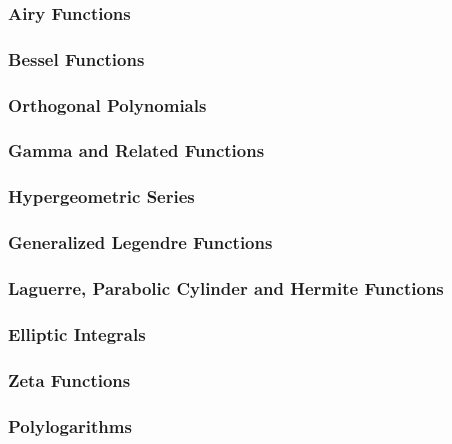 \subsubsection{Airy Functions}                 
\subsubsection{Bessel Functions}               
\subsubsection{Orthogonal Polynomials}         
\subsubsection{Gamma and Related Functions}    
\subsubsection{Hypergeometric Series}          
\subsubsection{Generalized Legendre Functions} 
\subsubsection{Laguerre, Parabolic Cylinder and Hermite Functions}
                                            
\subsubsection{Elliptic Integrals}             
\subsubsection{Zeta Functions}                 
\subsubsection{Polylogarithms}                 


